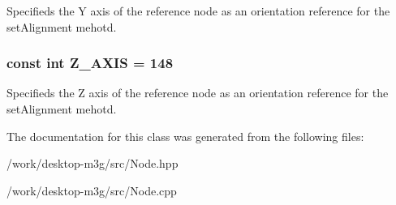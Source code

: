 Specifieds the Y axis of the reference node as an orientation reference for the setAlignment mehotd. \hypertarget{classm3g_1_1Node_a928e648c9ae9b4706937831f77f0c67}{
\subsubsection[{Z\_\-AXIS}]{\setlength{\rightskip}{0pt plus 5cm}const int {\bf Z\_\-AXIS} = 148}}
\label{classm3g_1_1Node_a928e648c9ae9b4706937831f77f0c67}


Specifieds the Z axis of the reference node as an orientation reference for the setAlignment mehotd. 

The documentation for this class was generated from the following files:\begin{CompactItemize}
\item 
/work/desktop-m3g/src/Node.hpp\item 
/work/desktop-m3g/src/Node.cpp\end{CompactItemize}
